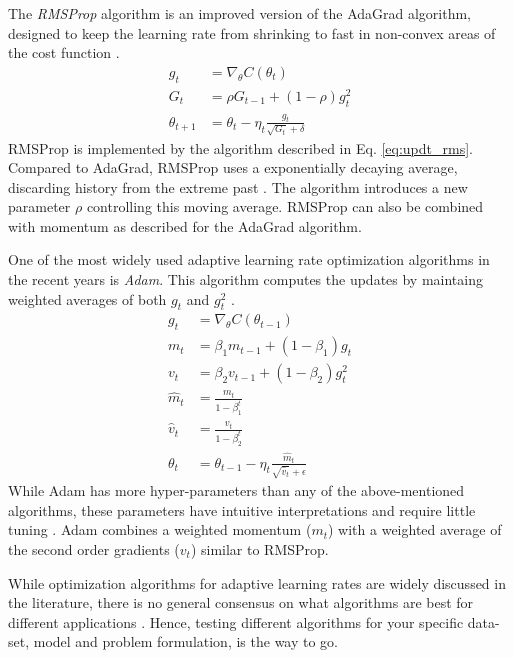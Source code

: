 The \textit{RMSProp} algorithm is an improved version of the AdaGrad algorithm, designed to keep the learning rate from shrinking to fast in non-convex areas of the cost function \citep[p. 122]{Ketkar2017}.
\begin{equation}\label{eq:updt_rms}
\begin{split}
    g_t &= \nabla_{\theta}C(\theta_t)   \\
    G_t &= \rho G_{t-1} + (1-\rho)g_t^2              \\
    \theta_{t+1} &= \theta_t - \eta_t \frac{g_t}{\sqrt{G_t} + \delta}
\end{split}
\end{equation}
RMSProp is implemented by the algorithm described in Eq. \ref{eq:updt_rms}.
Compared to AdaGrad, RMSProp uses a exponentially decaying average, discarding history from the extreme past \citep[p. 304]{Goodfellow-et-al-2016}.
The algorithm introduces a new parameter $\rho$ controlling this moving average.
RMSProp can also be combined with momentum as described for the AdaGrad algorithm.

One of the most widely used adaptive learning rate optimization algorithms in the recent years is \textit{Adam}.
This algorithm computes the updates by maintaing weighted averages of both $g_t$ and $g_t^2$ \citep[p. 123]{Ketkar2017}.
\begin{equation}\label{eq:updt_adam}
\begin{split}
    g_t &= \nabla_{\theta}C(\theta_{t-1})   \\
    m_t &= \beta_1m_{t-1} + (1-\beta_1)g_t \\
    v_t &= \beta_2v_{t-1} + (1-\beta_2)g_t^2 \\
    \hat{m}_t &= \frac{m_t}{1-\beta_1^t} \\
    \hat{v}_t &= \frac{v_t}{1-\beta_2^t} \\
    \theta_{t} &= \theta_{t-1} - \eta_t \frac{\hat{m}_t}{\sqrt{\hat{v}_t}+\epsilon}
\end{split}
\end{equation}
While Adam has more hyper-parameters than any of the above-mentioned algorithms, these parameters have intuitive interpretations and require little tuning \cite{kingba}.
Adam combines a weighted momentum ($m_t$) with a weighted average of the second order gradients ($v_t$) similar to RMSProp.

While optimization algorithms for adaptive learning rates are widely discussed in the literature, there is no general consensus on what algorithms are best for different applications \cite{schaul2014}.
Hence, testing different algorithms for your specific data-set, model and problem formulation, is the way to go.

